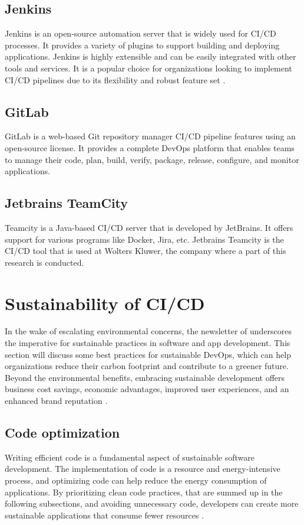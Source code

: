 \subsection{Jenkins}
Jenkins is an open-source automation server that is widely used for CI/CD processes. It provides a variety of plugins to support building and deploying applications. 
Jenkins is highly extensible and can be easily integrated with other tools and services. 
It is a popular choice for organizations looking to implement CI/CD pipelines due to its flexibility and robust feature set \autocite{Hat2023}.


\subsection{GitLab}
GitLab is a web-based Git repository manager CI/CD pipeline features using an open-source license.
It provides a complete DevOps platform that enables teams to manage their code, plan, build, verify, package, release, configure, and monitor applications.


\subsection{Jetbrains TeamCity}
Teamcity is a Java-based CI/CD server that is developed by JetBrains. It offers support for various programs like Docker, Jira, etc.
Jetbrains Teamcity is the CI/CD tool that is used at Wolters Kluwer, the company where a part of this research is conducted.



\section{Sustainability of CI/CD}
In the wake of escalating environmental concerns, the newsletter of \textcite{Corewave2023} underscores the imperative for sustainable practices in software and app development.
This section will discuss some best practices for sustainable DevOps, which can help organizations reduce their carbon footprint and contribute to a greener future.
Beyond the environmental benefits, embracing sustainable development offers business cost savings, economic advantages, improved user experiences, and an enhanced brand reputation \autocite{Corewave2023}.


\subsection{Code optimization}
Writing efficient code is a fundamental aspect of sustainable software development. 
The implementation of code is a resource and energy-intensive process, and optimizing code can help reduce the energy consumption of applications.
By prioritizing clean code practices, that are summed up in the following subsections, and avoiding unnecessary code, developers can create more sustainable applications that consume fewer resources \autocite{Corewave2023}.

